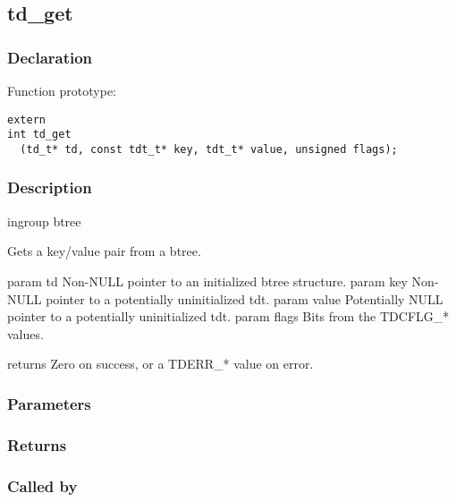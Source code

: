
\newpage
\subsection{td\_get}
\subsubsection{Declaration} Function prototype:

\begin{verbatim}
extern
int td_get
  (td_t* td, const tdt_t* key, tdt_t* value, unsigned flags);
\end{verbatim}

\subsubsection{Description}


 ingroup btree

 Gets a key/value pair from a btree.

 param td Non-NULL pointer to an initialized btree structure.
 param key Non-NULL pointer to a potentially uninitialized tdt.
 param value Potentially NULL pointer to a potentially uninitialized tdt.
 param flags Bits from the TDCFLG\_* values.

 returns Zero on success, or a TDERR\_* value on error.
 

\subsubsection{Parameters}
\subsubsection{Returns}
\subsubsection{Called by}
